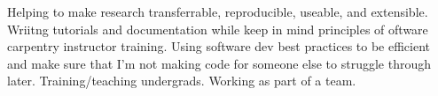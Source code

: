 
Helping to make research transferrable, reproducible, useable, and extensible. 
Wriitng tutorials and documentation while keep in mind principles of oftware carpentry instructor training. 
Using software dev best practices to be efficient and make sure that I'm not making code for someone else to struggle through later. 
Training/teaching undergrads.
Working as part of a team.
